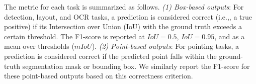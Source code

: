 \documentclass{llmxive}
\providecommand{\ie}{i.e.,\xspace}
\begin{document}
The metric for each task is summarized as follows. \textit{(1) Box-based outputs}: For detection, layout, and OCR tasks, a prediction is considered correct (\ie, a true positive) if its Intersection over Union (IoU) with the ground truth exceeds a certain threshold. The F1-score is reported at $IoU = 0.5$, $IoU = 0.95$, and as a mean over thresholds ($mIoU$). \textit{(2) Point-based outputs}: For pointing tasks, a prediction is considered correct if the predicted point falls within the ground-truth segmentation mask or bounding box. We similarly report the F1-score for these point-based outputs based on this correctness criterion.

\begin{table}[t]
    \centering
    \vspace{+3mm}
\end{table}
\end{document}
